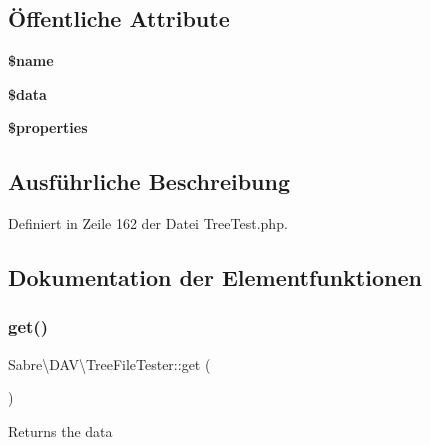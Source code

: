 \subsection*{Öffentliche Attribute}
\begin{DoxyCompactItemize}
\item 
\mbox{\label{class_sabre_1_1_d_a_v_1_1_tree_file_tester_aaef6954d5d23fcfbcef3a41b710d5ecf}} 
{\bfseries \$name}
\item 
\mbox{\label{class_sabre_1_1_d_a_v_1_1_tree_file_tester_a986d98bbb7d031b207aad35ef022ea3b}} 
{\bfseries \$data}
\item 
\mbox{\label{class_sabre_1_1_d_a_v_1_1_tree_file_tester_a1971b52a95a24c4578d1456b3e82cf37}} 
{\bfseries \$properties}
\end{DoxyCompactItemize}


\subsection{Ausführliche Beschreibung}


Definiert in Zeile 162 der Datei Tree\+Test.\+php.



\subsection{Dokumentation der Elementfunktionen}
\mbox{\label{class_sabre_1_1_d_a_v_1_1_tree_file_tester_a38879bb7792e5e5d2413aa142a46b466}} 
\subsubsection{\texorpdfstring{get()}{get()}}
{\footnotesize\ttfamily Sabre\textbackslash{}\+D\+A\+V\textbackslash{}\+Tree\+File\+Tester\+::get (\begin{DoxyParamCaption}{ }\end{DoxyParamCaption})}

Returns the data

